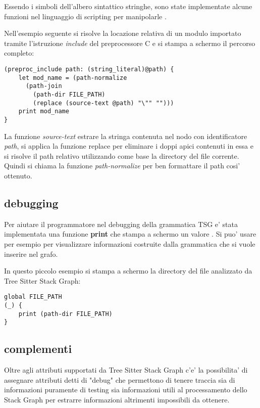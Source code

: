Essendo i simboli dell'albero sintattico stringhe, sono state implementate alcune funzioni nel linguaggio di scripting per manipolarle \cite{TreeSitterGraphReferenceFunctions} \cite{TreeSitterStackGraphPaths}.

Nell'esempio seguente si risolve la locazione relativa di un modulo importato tramite l'istruzione \emph{include} del preprocessore C e si stampa a schermo il percorso completo:

\begin{lstlisting}
(preproc_include path: (string_literal)@path) {
    let mod_name = (path-normalize
      (path-join
        (path-dir FILE_PATH)
        (replace (source-text @path) "\"" "")))
    print mod_name
}
\end{lstlisting}

La funzione \emph{source-text} estrare la stringa contenuta nel nodo con identificatore \emph{path}, si applica la funzione replace per eliminare i doppi apici contenuti in essa e si risolve il path relativo utilizzando come base la directory del file corrente.
Quindi si chiama la funzione \emph{path-normalize} per ben formattare il path cosi' ottenuto.

\subsection{debugging}

Per aiutare il programmatore nel debugging della grammatica TSG e' stata implementata una funzione \textbf{print} che stampa a schermo un valore \cite{TreeSitterGraphReferenceDebugging}.
Si puo' usare per esempio per visualizzare informazioni costruite dalla grammatica che si vuole inserire nel grafo.

In questo piccolo esempio si stampa a schermo la directory del file analizzato da Tree Sitter Stack Graph:

\begin{lstlisting}
global FILE_PATH
(_) {
    print (path-dir FILE_PATH)
}
\end{lstlisting}

\subsection{complementi}

Oltre agli attributi supportati da Tree Sitter Stack Graph c'e' la possibilita' di assegnare attributi detti di "debug" \cite{TreeSitterStackGraphDebugInfo} che permettono di tenere traccia sia di informazioni puramente di testing sia informazioni utili al processamento dello Stack Graph per estrarre informazioni altrimenti impossibili da ottenere.

